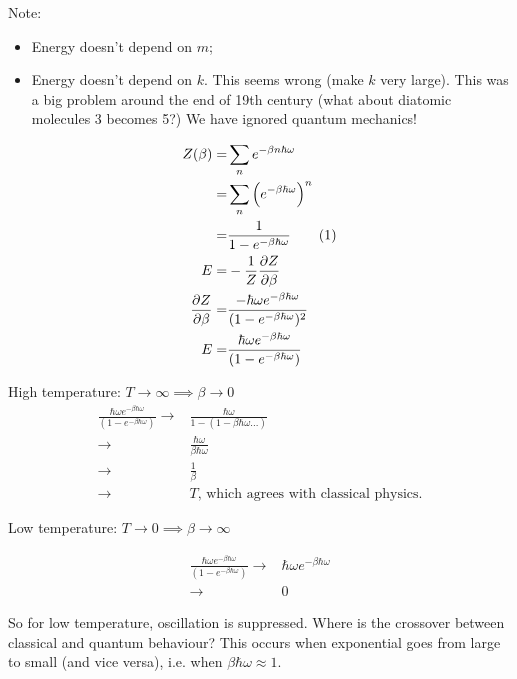 \documentclass[]{article}
\newcommand\numberthis{\addtocounter{equation}{1}\tag{\theequation}}
\begin{document}
Note:
\begin{itemize}
	\item Energy doesn't depend on $m$;
	\item Energy doesn't depend on $k$. This seems wrong (make $k$ very large). This was a big problem around the end of 19th century (what about diatomic molecules 3 becomes 5?) We have ignored quantum mechanics!
\end{itemize}



\begin{align*}
	Z(\beta) =& \sum_{n} e^{- \beta n \hbar \omega}\\
	 =& \sum_{n} \Big(e^{- \beta\hbar \omega}\Big)^n\\
	 =& \frac{1}{1 - e^{- \beta\hbar \omega}}\numberthis\label{Z_quantum_shm}\\
	 E =& - \frac{1}{Z} \frac{\partial Z}{\partial \beta}\\
	 \frac{\partial Z}{\partial \beta}=& \frac{- \hbar \omega e^{- \beta\hbar \omega}}{(1 - e^{- \beta\hbar \omega})^2}\\
	 E =& \frac{ \hbar \omega e^{- \beta\hbar \omega}}{(1 - e^{- \beta\hbar \omega})}
\end{align*}

High temperature: $T\rightarrow\infty \implies \beta \rightarrow 0$
\begin{align*}
	\frac{ \hbar \omega e^{- \beta\hbar \omega}}{(1 - e^{- \beta\hbar \omega})}\rightarrow& \frac{\hbar \omega}{1 -(1 - \beta \hbar \omega...)}\\
	\rightarrow& \frac{\hbar \omega}{\beta \hbar \omega}\\
	\rightarrow& \frac{1}{\beta}\\
	\rightarrow& T\text{, which agrees with classical physics.}
\end{align*}

Low temperature: $T\rightarrow 0 \implies \beta \rightarrow \infty$

\begin{align*}
\frac{ \hbar \omega e^{- \beta\hbar \omega}}{(1 - e^{- \beta\hbar \omega})}\rightarrow&\hbar \omega e^{- \beta\hbar \omega}\\
\rightarrow&0
\end{align*}

So for low temperature, oscillation is suppressed.	Where is the crossover between classical and quantum behaviour? This occurs when exponential goes from large to small (and vice versa), i.e. when $\beta\hbar \omega \approx 1$.
\end{document}
